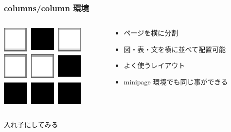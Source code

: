 \documentclass[dvipdfmx,cjk,xcolor=dvipsnames,envcountsect,notheorems,12pt]{beamer}
\theoremstyle{definition}
\begin{document}
\begin{frame}
  \frametitle{columns/column 環境}
  \begin{columns}%
    \begin{column}{0.2\textwidth}%
      \begin{center}
        \includegraphics{sample-image.eps}
      \end{center}
    \end{column}
    \begin{column}{0.8\textwidth}
      \begin{itemize}
      \item ページを横に分割
      \item 図・表・文を横に並べて配置可能
      \item よく使うレイアウト
      \item minipage 環境でも同じ事ができる
      \end{itemize}
    \end{column}
  \end{columns}
  \pause\vfill
  \begin{columns}%
    \begin{column}{0.4\textwidth}
      \begin{center}
        入れ子にしてみる
      \end{center}
      \begin{columns}
        \begin{column}{0.33\textwidth}

\end{column}
\end{columns}
\end{column}
\end{columns}
\end{frame}
\end{document}
